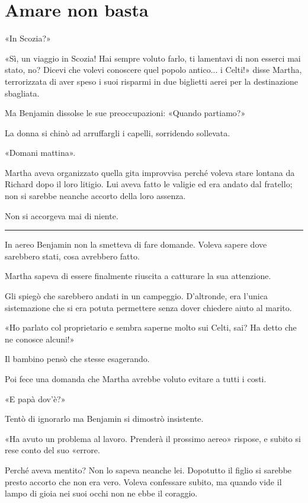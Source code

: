 \chapter{Amare non basta}
\label{ch:amare-non-basta}

«In Scozia?»

«Sì, un viaggio in Scozia! Hai sempre voluto farlo, ti lamentavi di non esserci mai stato, no?
Dicevi che volevi conoscere quel popolo antico... i Celti!» disse Martha, terrorizzata di aver speso
i suoi risparmi in due biglietti aerei per la destinazione sbagliata.

Ma Benjamin dissolse le sue preoccupazioni: «Quando partiamo?»

La donna si chinò ad arruffargli i capelli, sorridendo sollevata.

«Domani mattina».

Martha aveva organizzato quella gita improvvisa perché voleva stare lontana da Richard dopo il loro
litigio. Lui aveva fatto le valigie ed era andato dal fratello; non si sarebbe neanche accorto della
loro assenza.

Non si accorgeva mai di niente.

\plainbreak{1}

In aereo Benjamin non la smetteva di fare domande. Voleva sapere dove sarebbero stati, cosa
avrebbero fatto.

Martha sapeva di essere finalmente riuscita a catturare la sua attenzione.

Gli spiegò che sarebbero andati in un campeggio. D'altronde, era l'unica sistemazione che si era
potuta permettere senza dover chiedere aiuto al marito.

«Ho parlato col proprietario e sembra saperne molto sui Celti, sai? Ha detto che ne conosce alcuni!»

Il bambino pensò che stesse esagerando.

Poi fece una domanda che Martha avrebbe voluto evitare a tutti i costi.

«E papà dov'è?»

Tentò di ignorarlo ma Benjamin si dimostrò insistente.

«Ha avuto un problema al lavoro. Prenderà il prossimo aereo» rispose, e subito si rese conto del suo
«errore.

Perché aveva mentito? Non lo sapeva neanche lei. Dopotutto il figlio si sarebbe presto accorto che
non era vero. Voleva confessare subito, ma quando vide il lampo di gioia nei suoi occhi non ne ebbe
il coraggio.

